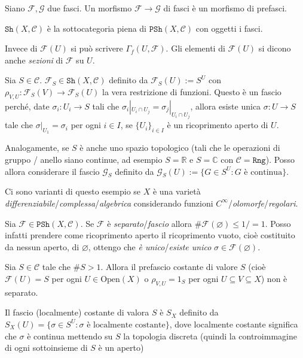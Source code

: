Siano \(\mathcal{F}, \mathcal{G}\) due fasci. Un morfismo \(\mathcal{F} \to
\mathcal{G}\) di fasci è un morfismo di prefasci. 

\(\mathtt{Sh}{(X, \mathcal{C})}\) è la sottocategoria piena di
\(\mathtt{PSh}{(X, \mathcal{C})}\) con oggetti i fasci.

\begin{note}[zione]
    Invece di \(\mathcal{F}{(U)}\) si può scrivere \(\Gamma_f{(U, %
    \mathcal{F})}\). Gli elementi di \(\mathcal{F}{(U)}\) si dicono anche
    \emph{sezioni} di \(\mathcal{F}\) su \(U\).
\end{note}

\begin{example}{}
    Sia \(S \in \mathcal{C}\). \(\mathcal{F}_{S} \in \mathtt{Sh}{(X,
    \mathcal{C})}\) definito da \(\mathcal{F}_S{(U)} := S^{U}\) con \(\rho_{V,U}
    : \mathcal{F}_S {(V)} \to \mathcal{F}_S{(U)}\) la vera restrizione di
    funzioni. Questo è un fascio perché, date \(\sigma_{i} : U_{i} \to S\) tali
    che \(\sigma_{i} |_{U_{i} \cap U_{j}} = \sigma_{j} |_{U_{i} \cap U_{j}}  \),
    allora esiste unica \(\sigma : U \to S\) tale che \(\sigma|_{U_{1}} =
    \sigma_{i}\) per ogni \(i \in I\), se \(\{U_{i}\}_{i \in I} \) è un
    ricoprimento aperto di \(U\).

    Analogamente, se \(S\) è anche uno spazio topologico (tali che le operazioni
    di gruppo / anello siano continue, ad esempio \(S = \mathbb{R}\) e \(S =
    \mathbb{C}\) con \(\mathcal{C} = \mathtt{Rng}\)). Posso allora considerare
    il fascio \(\mathcal{G}_{S} \) definito da \(\mathcal{G}_S {(U)} := \{G \in
    S^{U} : G\text{ è continua}\}\).

    Ci sono varianti di questo esempio se \(X\) è una varietà
    \emph{differenziabile}/\emph{complessa}/\emph{algebrica} considerando
    funzioni \(C^{\infty}\)/\emph{olomorfe}/\emph{regolari}.
\end{example}

\begin{remark}{}
    Sia \(\mathcal{F} \in \mathtt{PSh}{(X, \mathcal{C})}\). Se \(\mathcal{F}\) è
    \emph{separato}/\emph{fascio} allora \(\# \mathcal{F}{(\varnothing)} \le 1 /
    = 1\). Posso infatti prendere come ricoprimento aperto il ricoprimento
    vuoto, cioè costituito da nessun aperto, di \(\varnothing\), ottengo che
    \emph{è unico}/\emph{esiste unico} \(\sigma \in \mathcal{F}{(\varnothing)}\).
\end{remark}

\begin{example}{}
    Sia \(S \in \mathcal{C}\) tale che \(\# S > 1\). Allora il prefascio
    costante di valore \(S\) (cioè \(\mathcal{F}{(U)} = S\) per ogni \(U \in
    \mathrm{Open}{(X)}\) o \(\rho_{V, U} = 1_S\) per ogni \(U \subseteq V
    \subseteq X\)) non è separato.

    Il fascio (localmente) costante di valora \(S\) è \(S_X\) definito da \(S_X
    {(U)} = \{\sigma \in S^{U} : \sigma \text{ è localmente costante}\}\), dove
    localmente costante significa che \(\sigma\) è continua mettendo su \(S\) la
    topologia discreta (quindi la controimmagine di ogni sottoinsieme di \(S\) è
    un aperto)
\end{example}

